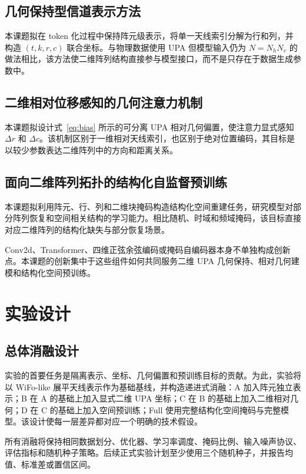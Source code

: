 \documentclass[journal]{IEEEtran}
\begin{document}
\subsection{几何保持型信道表示方法}

本课题拟在 token 化过程中保持阵元级表示，将单一天线索引分解为行和列，并构造 \((t,k,r,c)\) 联合坐标。与物理数据使用 UPA 但模型输入仍为 \(N=N_hN_v\) 的做法相比，该方法使二维阵列结构直接参与模型接口，而不是只存在于数据生成参数中。

\subsection{二维相对位移感知的几何注意力机制}

本课题拟设计式~\eqref{eq:bias} 所示的可分离 UPA 相对几何偏置，使注意力显式感知 \(\Delta r\) 和 \(\Delta c\)。该机制区别于一维相对天线索引，也区别于绝对位置编码，其目标是以较少参数表达二维阵列中的方向和距离关系。

\subsection{面向二维阵列拓扑的结构化自监督预训练}

本课题拟利用阵元、行、列和二维块掩码构造结构化空间重建任务，研究模型对部分阵列恢复和空间相关结构的学习能力。相比随机、时域和频域掩码，该目标直接对应二维阵列的结构化缺失与部分恢复场景。

Conv2d、Transformer、四维正弦余弦编码或掩码自编码器本身不单独构成创新点。本课题的创新集中于这些组件如何共同服务二维 UPA 几何保持、相对几何建模和结构化空间预训练。

\section{实验设计}

\subsection{总体消融设计}

实验的首要任务是隔离表示、坐标、几何偏置和预训练目标的贡献。为此，实验将以 WiFo-like 展平天线表示作为基础基线，并构造递进式消融：A 加入阵元独立表示；B 在 A 的基础上加入显式二维 UPA 坐标；C 在 B 的基础上加入二维相对几何；D 在 C 的基础上加入空间预训练；Full 使用完整结构化空间掩码与完整模型。该设计使每一层差异都对应一个明确的技术假设。

所有消融将保持相同数据划分、优化器、学习率调度、掩码比例、输入噪声协议、评估指标和随机种子策略。后续正式实验计划至少使用三个随机种子，并报告均值、标准差或置信区间。
\end{document}
